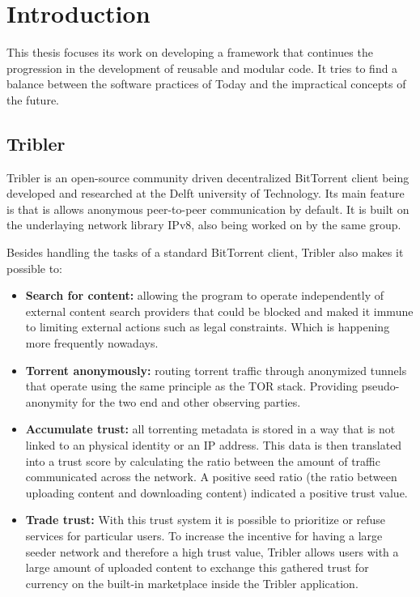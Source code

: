 \chapter{Introduction}


This thesis focuses its work on developing a framework that continues the progression in the development of reusable and modular code. It tries to find a balance between the software practices of Today and the impractical concepts of the future.


\section{Tribler}


Tribler is an open-source community driven decentralized BitTorrent client being developed and researched at the Delft university of Technology. Its main feature is that is allows anonymous peer-to-peer communication by default. It is built on the underlaying network library IPv8, also being worked on by the same group.

Besides handling the tasks of a standard BitTorrent client, Tribler also makes it possible to:

\begin{itemize}
	\item \textbf{Search for content: } allowing the program to operate independently of external content search providers that could be blocked and maked it immune to limiting external actions such as legal constraints. Which is happening more frequently nowadays.
	\item \textbf{Torrent anonymously: } routing torrent traffic through anonymized tunnels that operate using the same principle as the TOR stack. Providing pseudo-anonymity for the two end and other observing parties.
	\item \textbf{Accumulate trust: } all torrenting metadata is stored in a way that is not linked to an physical identity or an IP address. This data is then translated into a trust score by calculating the ratio between the amount of traffic communicated across the network. A positive seed ratio (the ratio between uploading content and downloading content) indicated a positive trust value.
	\item \textbf{Trade trust: } With this trust system it is possible to prioritize or refuse services for particular users. To increase the incentive for having a large seeder network and therefore a high trust value, Tribler allows users with a large amount of uploaded content to exchange this gathered trust for currency on the built-in marketplace inside the Tribler application.
\end{itemize}

